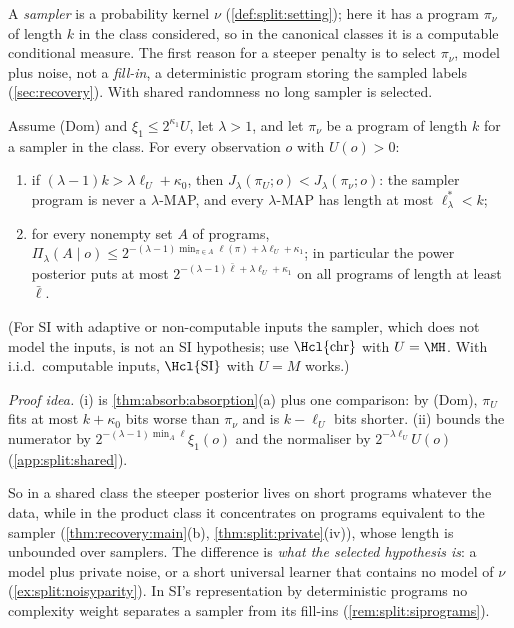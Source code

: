 A \emph{sampler} is a probability kernel $\nu$ (\cref{def:split:setting}); here it has a program $\pi_\nu$ of length $k$ in the class considered, so in the canonical classes it is a computable conditional measure. The first reason for a steeper penalty is to select $\pi_\nu$, model plus noise, not a \emph{fill-in}, a deterministic program storing the sampled labels (\cref{sec:recovery}). With shared randomness no long sampler is selected.

\begin{theorem}\label{thm:split:shared}
Assume (Dom) and $\xi_1\le2^{\kappa_1}U$, let $\lambda>1$, and let $\pi_\nu$ be a program of length $k$ for a sampler in the class. For every observation $o$ with $U(o)>0$:
\begin{enumerate}[label=(\roman*),itemsep=0pt,topsep=2pt]
\item if $(\lambda-1)k>\lambda\ell_U+\kappa_0$, then $J_\lambda(\pi_U;o)<J_\lambda(\pi_\nu;o)$: the sampler program is never a $\lambda$-MAP, and every $\lambda$-MAP has length at most $\ell^*_\lambda<k$;
\item for every nonempty set $A$ of programs, $\Pi_\lambda(A\mid o)\le2^{-(\lambda-1)\min_{\pi\in A}\ell(\pi)+\lambda\ell_U+\kappa_1}$; in particular the power posterior puts at most $2^{-(\lambda-1)\bar\ell+\lambda\ell_U+\kappa_1}$ on all programs of length at least $\bar\ell$.
\end{enumerate}
(For SI with adaptive or non-computable inputs the sampler, which does not model the inputs, is not an SI hypothesis; use $\Hcl{\mathrm{chr}}$ with $U=\MH$. With i.i.d.\ computable inputs, $\Hcl{\mathrm{SI}}$ with $U=M$ works.)
\end{theorem}

\emph{Proof idea.} (i) is \cref{thm:absorb:absorption}(a) plus one comparison: by (Dom), $\pi_U$ fits at most $k+\kappa_0$ bits worse than $\pi_\nu$ and is $k-\ell_U$ bits shorter. (ii) bounds the numerator by $2^{-(\lambda-1)\min_A\ell}\xi_1(o)$ and the normaliser by $2^{-\lambda\ell_U}U(o)$ (\cref{app:split:shared}).

So in a shared class the steeper posterior lives on short programs whatever the data, while in the product class it concentrates on programs equivalent to the sampler (\cref{thm:recovery:main}(b), \cref{thm:split:private}(iv)), whose length is unbounded over samplers. The difference is \emph{what the selected hypothesis is}: a model plus private noise, or a short universal learner that contains no model of $\nu$ (\cref{ex:split:noisyparity}). In SI's representation by deterministic programs no complexity weight separates a sampler from its fill-ins (\cref{rem:split:siprograms}).

